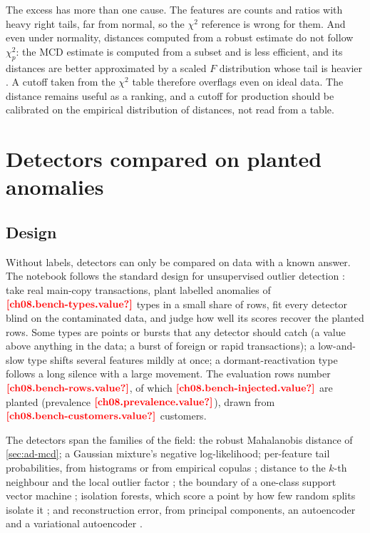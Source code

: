 The excess has more than one cause. The features are counts and ratios with heavy right tails, far from normal, so the
$\chi^2$ reference is wrong for them. And even under normality, distances computed from a robust estimate do not follow
$\chi^2_p$: the MCD estimate is computed from a subset and is less efficient, and its distances are better approximated
by a scaled $F$ distribution whose tail is heavier \autocite{hardin2005}. A cutoff taken from the $\chi^2$ table
therefore overflags even on ideal data. The distance remains useful as a ranking, and a cutoff for production should be
calibrated on the empirical distribution of distances, not read from a table.

\section{Detectors compared on planted anomalies}\label{sec:ad-benchmark}

\subsection{Design}

Without labels, detectors can only be compared on data with a known answer. The notebook follows the standard design
for unsupervised outlier detection \autocite{campos2016}: take real main-copy transactions, plant labelled anomalies
of $\est{ch08.bench-types}{value}$ types in a small share of rows, fit every detector blind on the contaminated data, and judge how well its
scores recover the planted rows. Some types are points or bursts that any detector should catch (a value above anything
in the data; a burst of foreign or rapid transactions); a low-and-slow type shifts several features mildly at once; a
dormant-reactivation type follows a long silence with a large movement. The evaluation rows number
$\est{ch08.bench-rows}{value}$, of which $\est{ch08.bench-injected}{value}$ are planted (prevalence
$\est{ch08.prevalence}{value}$), drawn from $\est{ch08.bench-customers}{value}$ customers.

The detectors span the families of the field: the robust Mahalanobis distance of \cref{sec:ad-mcd}; a Gaussian
mixture's negative log-likelihood; per-feature tail probabilities, from histograms \autocite{goldstein2012} or from
empirical copulas \autocite{li2020,li2023}; distance to the $k$-th neighbour \autocite{ramaswamy2000} and the local
outlier factor \autocite{breunig2000}; the boundary of a one-class support vector machine \autocite{scholkopf2001};
isolation forests, which score a point by how few random splits isolate it \autocite{liu2008}; and reconstruction
error, from principal components, an autoencoder and a variational autoencoder \autocite{kingma2014}.

